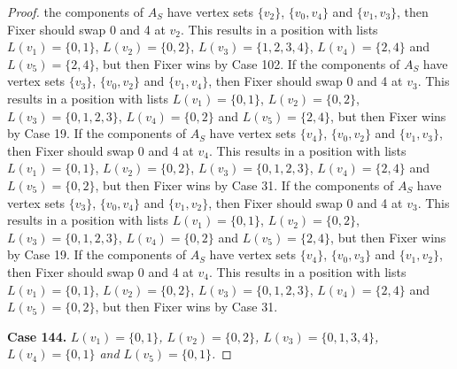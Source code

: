 \documentclass[12pt]{amsart}
\theoremstyle{plain}
\theoremstyle{definition}
\theoremstyle{remark}
\begin{document}
\begin{proof}
the components of $A_S$ have vertex sets $\{v_2\}$, $\{v_0, v_4\}$ and $\{v_1, v_3\}$, then Fixer should swap 0 and 4 at $v_2$. This results in a position with lists $L(v_1) = \{0, 1\}$, $L(v_2) = \{0, 2\}$, $L(v_3) = \{1, 2, 3, 4\}$, $L(v_4) = \{2, 4\}$ and $L(v_5) = \{2, 4\}$, but then Fixer wins by Case 102. If the components of $A_S$ have vertex sets $\{v_3\}$, $\{v_0, v_2\}$ and $\{v_1, v_4\}$, then Fixer should swap 0 and 4 at $v_3$. This results in a position with lists $L(v_1) = \{0, 1\}$, $L(v_2) = \{0, 2\}$, $L(v_3) = \{0, 1, 2, 3\}$, $L(v_4) = \{0, 2\}$ and $L(v_5) = \{2, 4\}$, but then Fixer wins by Case 19. If the components of $A_S$ have vertex sets $\{v_4\}$, $\{v_0, v_2\}$ and $\{v_1, v_3\}$, then Fixer should swap 0 and 4 at $v_4$. This results in a position with lists $L(v_1) = \{0, 1\}$, $L(v_2) = \{0, 2\}$, $L(v_3) = \{0, 1, 2, 3\}$, $L(v_4) = \{2, 4\}$ and $L(v_5) = \{0, 2\}$, but then Fixer wins by Case 31. If the components of $A_S$ have vertex sets $\{v_3\}$, $\{v_0, v_4\}$ and $\{v_1, v_2\}$, then Fixer should swap 0 and 4 at $v_3$. This results in a position with lists $L(v_1) = \{0, 1\}$, $L(v_2) = \{0, 2\}$, $L(v_3) = \{0, 1, 2, 3\}$, $L(v_4) = \{0, 2\}$ and $L(v_5) = \{2, 4\}$, but then Fixer wins by Case 19. If the components of $A_S$ have vertex sets $\{v_4\}$, $\{v_0, v_3\}$ and $\{v_1, v_2\}$, then Fixer should swap 0 and 4 at $v_4$. This results in a position with lists $L(v_1) = \{0, 1\}$, $L(v_2) = \{0, 2\}$, $L(v_3) = \{0, 1, 2, 3\}$, $L(v_4) = \{2, 4\}$ and $L(v_5) = \{0, 2\}$, but then Fixer wins by Case 31. 

\noindent\textbf{Case 144.  }\textit{$L(v_1) = \{0, 1\}$, $L(v_2) = \{0, 2\}$, $L(v_3) = \{0, 1, 3, 4\}$, $L(v_4) = \{0, 1\}$ and $L(v_5) = \{0, 1\}$.}


\end{proof}
\end{document}
